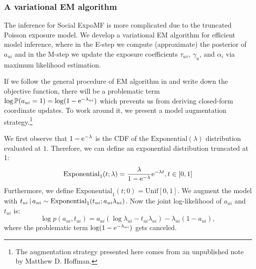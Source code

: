 
\subsubsection{A variational EM algorithm}

The inference for Social ExpoMF is more complicated due to the truncated Poisson exposure model. We develop a variational \gls{EM} algorithm for efficient model inference, where in the E-step we compute (approximate) the posterior of $a_{ui}$ and in the M-step we update the exposure coefficients $\tau_{uv}$, $\gamma_u$, and $\alpha_i$ via maximum likelihood estimation.

If we follow the general procedure of \gls{EM} algorithm in  and write down the objective function, there will be a problematic term $\log \mathbb{P}(a_{ui} = 1) = \log (1 - \mathrm{e}^{-\lambda_{ui}})$ which prevents us from deriving closed-form coordinate updates. To work around it, we present a model augmentation strategy.\footnote{The augmentation strategy presented here comes from an unpublished note by Matthew D. Hoffman.}

We first observe that $1 - \mathrm{e}^{-\lambda}$ is the \gls{CDF} of the $\mathrm{Exponential}(\lambda)$ distribution evaluated at $1$. Therefore, we can define an exponential distribution truncated at 1:
\[
\mathrm{Exponential}_1(t; \lambda) = \frac{\lambda}{1 - \mathrm{e}^{-\lambda}} \mathrm{e}^{-\lambda t}, t\in[0, 1]
\]
Furthermore, we define $\mathrm{Exponential}_1(t; 0) = \mathrm{Unif}[0, 1]$. We augment the model with 
 $t_{ui} \,\vert\, a_{ui} \sim \mathrm{Exponential}_1(t_{ui}; a_{ui}\lambda_{ui})$. Now the joint log-likelihood of $a_{ui}$ and $t_{ui}$ is:
\[
\log p(a_{ui}, t_{ui}) = a_{ui} (\log \lambda_{ui} - t_{ui} \lambda_{ui}) - \lambda_{ui}(1 - a_{ui}),
\]
where the problematic term $\log (1 - \mathrm{e}^{-\lambda_{ui}})$ gets canceled.

